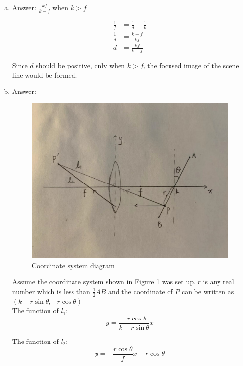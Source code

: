 \documentclass{homework}
\begin{document}
\begin{enumerate}[a)]
	\item Answer: $\frac{kf}{k- f}$ when $k> f$
	
	\begin{align*}
	\frac{1}{f} &=\frac{1}{d} + \frac{1}{k} \\
	\frac{1}{d} &= \frac{k-f}{kf} \\
	d &= \frac{kf}{k-f}
	\end{align*}

	Since $d$ should be positive, only when $k > f$, the focused image of the scene line would be formed.
	
	\item Answer: 
	\begin{figure}[h!]
	\centering
  	\includegraphics[scale=0.3]{p2b.jpg}
  	\caption{Coordinate system diagram}
  	\label{fig:p2b}
	\end{figure}
	
	Assume the coordinate system shown in Figure \ref{fig:p2b} was set up. $r$ is any real number which is less than $\frac{1}{2}AB$ and the coordinate of $P$ can be written as $(k-r\sin\theta, -r\cos\theta)$ \\
	
	The function of $l_1$: 
	\begin{equation}
	y=\frac{-r\cos\theta}{k-r\sin\theta}x\label{eq:1}
	\end{equation}
	
	The function of $l_2$: 
	\begin{equation}
	y=-\frac{r\cos\theta}{f}x-r\cos\theta\label{eq:2}
	\end{equation}
	

\end{enumerate}
\end{document}
